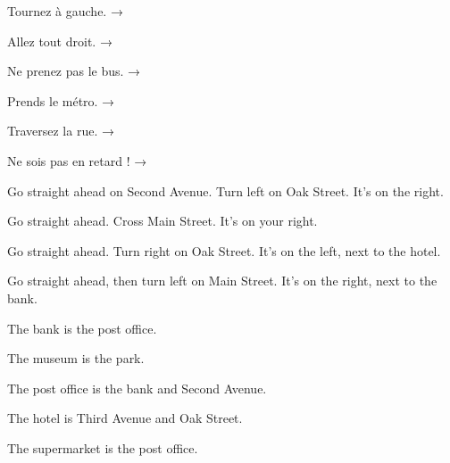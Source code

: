 \begin{questions}[2][french]
\item Tournez à gauche. → 
\item Allez tout droit. → 
\item Ne prenez pas le bus. → 
\item Prends le métro. → 
\item Traversez la rue. → 
\item Ne sois pas en retard ! → 
\end{questions}

\begin{center}\otPlanVille\end{center}
\begin{questions}
\item Go straight ahead on Second Avenue. Turn left on Oak Street. It's on the right. \hfill {}
\item Go straight ahead. Cross Main Street. It's on your right. \hfill {}
\item Go straight ahead. Turn right on Oak Street. It's on the left, next to the hotel. \hfill {}
\item Go straight ahead, then turn left on Main Street. It's on the right, next to the bank. \hfill {}
\end{questions}

\begin{questions}
\item The bank is  the post office.
\item The museum is  the park.
\item The post office is  the bank and Second Avenue.
\item The hotel is  Third Avenue and Oak Street.
\item The supermarket is  the post office.
\end{questions}

